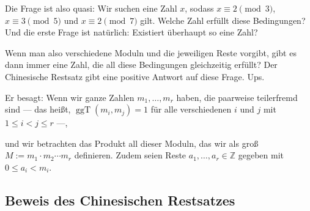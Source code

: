 \begin{spoken-clean}[01:00:35 - 01:03:41]
Die Frage ist also quasi: Wir suchen eine Zahl $x$, sodass $x \equiv 2 \pmod 3$, $x \equiv 3 \pmod 5$ und $x \equiv 2 \pmod 7$ gilt. Welche Zahl erfüllt diese Bedingungen? Und die erste Frage ist natürlich: Existiert überhaupt so eine Zahl?

Wenn man also verschiedene Moduln und die jeweiligen Reste vorgibt, gibt es dann immer eine Zahl, die all diese Bedingungen gleichzeitig erfüllt? Der Chinesische Restsatz gibt eine positive Antwort auf diese Frage.  Ups.

Er besagt: Wenn wir ganze Zahlen $m_1, \dots, m_r$ haben, die paarweise teilerfremd sind --- das heißt, $\operatorname{ggT}(m_i, m_j) = 1$ für alle verschiedenen $i$ und $j$ mit $1 \le i < j \le r$ ---,

und wir betrachten das Produkt all dieser Moduln, das wir als groß $M := m_1 \cdot m_2 \cdots m_r$ definieren. Zudem seien Reste $a_1, \dots, a_r \in \mathbb{Z}$ gegeben mit $0 \le a_i < m_i$.
\end{spoken-clean}

\begin{math-stroke}
\end{math-stroke}

\subsection{Beweis des Chinesischen Restsatzes}

